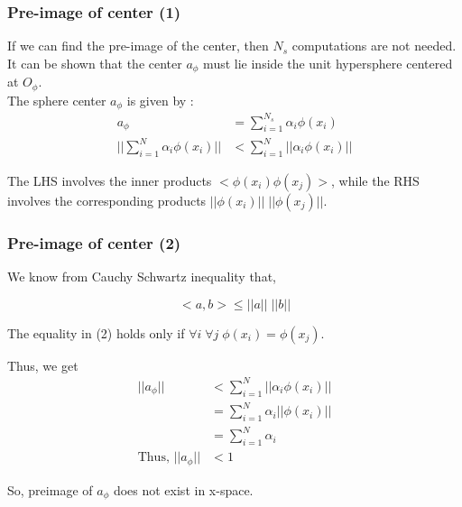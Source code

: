 \documentclass{beamer}
\begin{document}


\begin{frame}
\frametitle{Pre-image of center (1)}

If we can find the pre-image of the center, then $N_s$ computations are not needed. 
It can be shown that the center $a_\phi$ must lie inside the unit hypersphere centered at $O_\phi$.  \\[5pt]

The sphere center $a_\phi$ is given by :
\begin{equation}
\begin{split}
a_\phi  &= \sum\limits_{i=1}^{N_s} \alpha_i \phi(x_i)  \\ 
|| \sum\limits_{i=1}^N \alpha_i \phi(x_i) ||  &< \sum\limits_{i=1}^N || \alpha_i \phi(x_i) ||
\end{split}
\end{equation}

The LHS involves the inner products $<\phi(x_i) \phi(x_j)>$, while the RHS involves the corresponding products  $|| \phi(x_i)|| \; || \phi(x_j) ||$.

\end{frame}




\begin{frame}
\frametitle{Pre-image of center (2)}
We know from Cauchy Schwartz inequality that, 

\[ <a,b> \leq ||a|| \; ||b|| \] 


The equality in (2) holds only if  $ \forall i \;  \forall j  \; \phi(x_i) = \phi(x_j)$.

Thus, we get 
\begin{equation}
\begin{split}
|| a_\phi || &< \sum\limits_{i=1}^N || \alpha_i \phi(x_i) ||  \\
& = \sum\limits_{i=1}^N \alpha_i ||  \phi(x_i) || \\
& =  \sum\limits_{i=1}^N \alpha_i \\
\text{Thus, } ||a_\phi|| & < 1
\end{split}
\end{equation}
\begin{center}So, preimage of $a_\phi$ does not exist in x-space.\end{center}

\end{frame}
\end{document}
